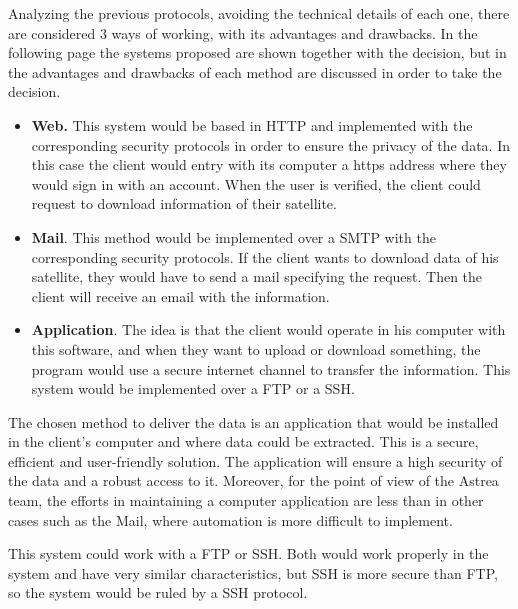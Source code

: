 Analyzing the previous protocols, avoiding the technical details of each one, there are considered 3 ways of working, with its advantages and drawbacks. In the following page the systems proposed are shown together with the decision, but in \cite[Chapter 2, Section 3]{annex3} the advantages and drawbacks of each method are discussed in order to take the decision.
\begin{itemize}
\item \textbf{Web.} This system would be based in HTTP and implemented with the corresponding security protocols in order to ensure the privacy of the data. In this case the client would entry with its computer a https address where they would sign in with an account. When the user is verified, the client could request to download information of their satellite. 
\item \textbf{Mail}. This method would be implemented over a SMTP with the corresponding security protocols. If the client wants to download data of his satellite, they would have to send a mail specifying the request. Then the client will receive an email with the information.
\item \textbf{Application}.  The idea is that the client would operate in his computer with this software, and when they want to upload or download something, the program would use a secure internet channel to transfer the information. This system would be implemented over a FTP or a SSH. 
\end{itemize}

The chosen method to deliver the data is an application that would be installed in the client's computer and where data could be extracted. This is a secure, efficient and user-friendly solution. The application will ensure a high security of the data and a robust access to it. Moreover, for the point of view of the Astrea team, the efforts in maintaining a computer application are less than in other cases such as the Mail, where automation is more difficult to implement.

This system could work with a FTP or SSH. Both would work properly in the system and have very similar characteristics, but SSH is more secure than FTP, so the system would be ruled by a SSH protocol.